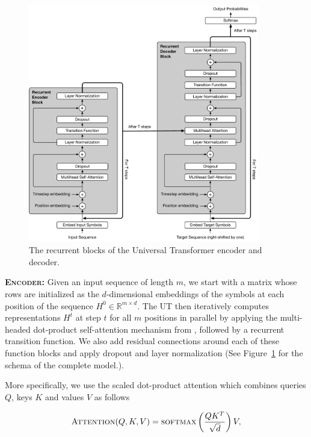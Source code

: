 \begin{figure}[t]
 \centering
 \includegraphics[width=0.9\textwidth]{04-part-03/chapter-06/figs_and_tables/fig_universal-transformer-complete.pdf}
 \caption{The recurrent blocks of the Universal Transformer encoder and decoder.}
 \label{fig:universal-transformer-complete}
\end{figure}

\textbf{\textsc{Encoder:}} Given an input sequence of length $m$, we start with a matrix whose rows are initialized as the $d$-dimensional embeddings of the symbols at each position of the sequence $H^0 \in \mathbb{R}^{m \times d}$. The UT then iteratively computes representations $H^t$ at step $t$ for all $m$ positions in parallel by applying the multi-headed dot-product self-attention mechanism from \cite{transformer}, followed by a recurrent transition function. We also add residual connections around each of these function blocks and apply dropout and layer normalization \citep{srivastava2014dropout, layernorm2016} (See Figure~\ref{fig:universal-transformer-complete} for the schema of the complete model.).

More specifically, we use the scaled dot-product attention which combines queries $Q$, keys $K$ and values $V$ as follows

\begin{equation}
   \textsc{Attention}(Q, K, V) = \textsc{softmax} \left( \frac{QK^T}{\sqrt{d}} \right) V,
\end{equation}

